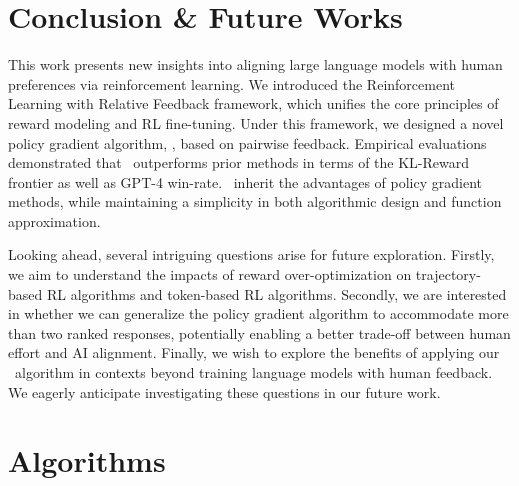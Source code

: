 \documentclass{article} %
\newcommand{\algn}{\text{P3O}}
\begin{document}
\section{Conclusion \& Future Works}
\label{sec:conclusion}
This work presents new insights into aligning large language models with human preferences via reinforcement learning. We introduced the Reinforcement Learning with Relative Feedback framework, which unifies the core principles of reward modeling and RL fine-tuning. Under this framework, we designed a novel policy gradient algorithm, \algn, based on pairwise feedback. Empirical evaluations demonstrated that \algn\ outperforms prior methods in terms of the KL-Reward frontier as well as GPT-4 win-rate. \algn\ inherit the advantages of policy gradient methods, while maintaining a simplicity in both algorithmic design and function approximation.

Looking ahead, several intriguing questions arise for future exploration. Firstly, we aim to understand the impacts of reward over-optimization on trajectory-based RL algorithms and token-based RL algorithms. Secondly, we are interested in whether we can generalize the policy gradient algorithm to accommodate more than two ranked responses, potentially enabling a better trade-off between human effort and AI alignment. Finally, we wish to explore the benefits of applying our \algn\ algorithm in contexts beyond training language models with human feedback. We eagerly anticipate investigating these questions in our future work.






\appendix
\section{Algorithms}
\end{document}
